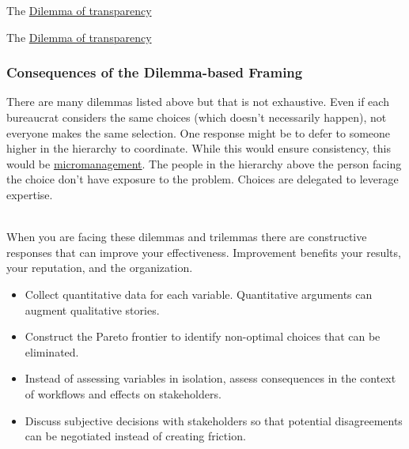 The \href{table:dilemma-transparency}{Dilemma of transparency}

The \href{table:dilemma-transparency}{Dilemma of transparency}



\subsubsection{Consequences of the Dilemma-based Framing}

There are many dilemmas listed above but that is not exhaustive. Even if each bureaucrat considers the same choices (which doesn't necessarily happen), not everyone makes the same selection. One response might be to defer to someone higher in the hierarchy to coordinate. While this would ensure consistency, this would be \href{https://en.wikipedia.org/wiki/Micromanagement}{micromanagement}. The people in the hierarchy above the person facing the choice don't have exposure to the problem. Choices are delegated to leverage expertise. 

\ \\

When you are facing these dilemmas and trilemmas
there are constructive responses that can improve your effectiveness. Improvement benefits your results, your reputation, and the organization. 
\begin{itemize}
    \item Collect quantitative data for each variable. Quantitative arguments can augment qualitative stories. 
    \item Construct the Pareto frontier to identify non-optimal choices that can be eliminated.
    \item Instead of assessing variables in isolation, assess consequences in the context of workflows and effects on stakeholders.
    \item Discuss subjective decisions with stakeholders so that potential disagreements can be negotiated instead of creating friction.
\end{itemize}
 


